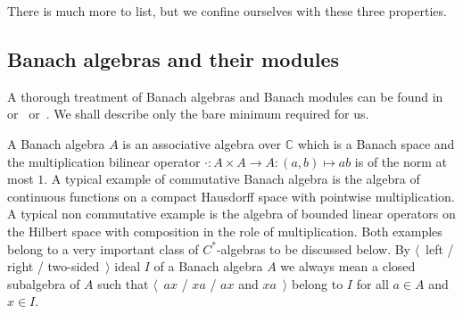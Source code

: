 There is much more to list, but we confine ourselves with these three
properties.


\subsection{Banach algebras and their
modules}\label{SubSectionBanachAlgebrasAndTheirModules}

A thorough treatment of Banach algebras and Banach modules can be found
in~\cite{HelBanLocConvAlg} or~\cite{HelHomolBanTopAlg}
or~\cite{DalBanAlgAutCont}. We shall describe only the bare minimum required for
us.

A Banach algebra $A$ is an associative algebra over $\mathbb{C}$ which is a
Banach space and the multiplication bilinear operator 
$\cdot:A\times A\to A:(a,b)\mapsto ab$ is of the norm at most $1$. A typical
example of commutative Banach algebra is the algebra of continuous functions on
a compact Hausdorff space with pointwise multiplication. A typical non
commutative example is the algebra of bounded linear operators on the Hilbert
space with composition in the role of multiplication. Both examples belong to a
very important class of $C^*$-algebras to be discussed below. By $\langle$~left
/ right / two-sided~$\rangle$ ideal $I$ of a Banach algebra $A$ we always mean a
closed subalgebra of $A$ such that $\langle$~$ax$ / $xa$ / $ax$ and
$xa$~$\rangle$ belong to $I$ for all $a\in A$ and $x\in I$.

